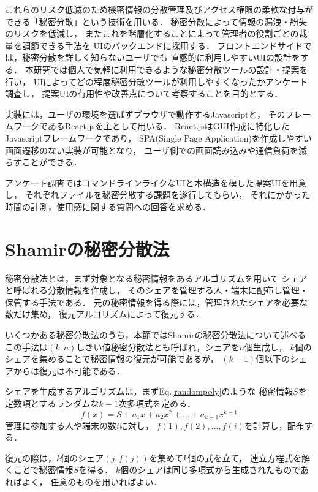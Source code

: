 \documentclass[twocolumn, fleqn, uplatex]{jsarticle}
\begin{document}
これらのリスク低減のため機密情報の分散管理及びアクセス権限の柔軟な付与が%
できる「秘密分散\cite{lit:nishikawa}」という技術を用いる．%
秘密分散によって情報の漏洩・紛失のリスクを低減し，%
またこれを階層化することによって管理者の役割ごとの裁量を調節できる手法を%
UIのバックエンドに採用する．%
フロントエンドサイドでは，秘密分散を詳しく知らないユーザでも%
直感的に利用しやすいUIの設計をする．%
本研究では個人で気軽に利用できるような秘密分散ツールの設計・提案を行い，%
UIによってどの程度秘密分散ツールが利用しやすくなったかアンケート調査し，%
提案UIの有用性や改善点について考察することを目的とする．

実装には，ユーザの環境を選ばずブラウザで動作するJavascriptと，%
そのフレームワークであるReact.jsを主として用いる．%
React.jsはGUI作成に特化したJavascriptフレームワークであり，%
SPA(Single Page Application)を作成しやすい画面遷移のない実装が可能となり，%
ユーザ側での画面読み込みや通信負荷を減らすことができる．

アンケート調査ではコマンドラインライクなUIと木構造を模した提案UIを用意し，
それぞれファイルを秘密分散する課題を遂行してもらい，%
それにかかった時間の計測，使用感に関する質問への回答を求める．

\section{Shamirの秘密分散法}
秘密分散法とは，まず対象となる秘密情報をあるアルゴリズムを用いて%
シェアと呼ばれる分散情報を作成し，%
そのシェアを管理する人・端末に配布し管理・保管する手法である．%
元の秘密情報を得る際には，管理されたシェアを必要な数だけ集め，%
復元アルゴリズムによって復元する．

いくつかある秘密分散法のうち，本節ではShamirの秘密分散法\cite{lit:shamir}について述べる%
この手法は$(k,n)$しきい値秘密分散法とも呼ばれ，シェアを$n$個生成し，%
$k$個のシェアを集めることで秘密情報の復元が可能であるが，%
$(k-1)$個以下のシェアからは復元は不可能である．

シェアを生成するアルゴリズムは，まずEq.\ref{randompoly}のような%
秘密情報$S$を定数項とするランダムな$k-1$次多項式を定める．
%
\begin{equation}
f(x) = S + a_{1}x + a_{2}x^{2} + \dots + a_{k-1}x^{k-1} \label{randompoly}
\end{equation}
%
管理に参加する人や端末の数$i$に対し，%
$f(1),f(2),\dots,f(i)$を計算し，配布する．

復元の際は，$k$個のシェア$(j,f(j))$を集めて$k$個の式を立て，%
連立方程式を解くことで秘密情報$S$を得る．
$k$個のシェアは同じ多項式から生成されたものであればよく，%
任意のものを用いればよい．
\end{document}
